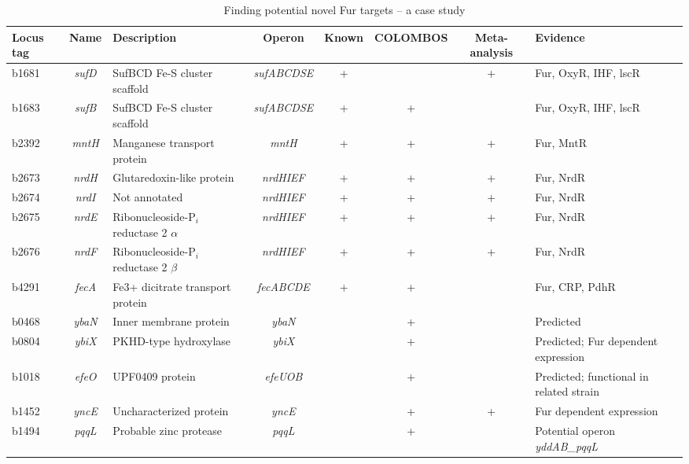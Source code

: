\begin{sidewaystable}
\centering
\caption{Finding potential novel Fur targets – a case study}
\label{tab:colTB-case}
\begin{scriptsize}
\begin{tabular}{ l c >{\raggedright}p{4cm} c c c c 
>{\raggedright\arraybackslash}p{4cm} }
	\toprule
	\textbf{{\scriptsize Locus tag}} & \textbf{{\scriptsize Name}} & \textbf{{\scriptsize Description}} & \textbf{{\scriptsize Operon}} & \textbf{{\scriptsize Known}} & \textbf{{\scriptsize COLOMBOS}} & \textbf{{\scriptsize Meta-analysis}} & \textbf{{\scriptsize Evidence}} \\
	\midrule
	b1681 & \textit{sufD} & SufBCD Fe-S cluster scaffold & \textit{sufABCDSE} & + & & + & Fur, OxyR, IHF, lscR \\[1ex]
	b1683 & \textit{sufB} & SufBCD Fe-S cluster scaffold & \textit{sufABCDSE} & + & + & & Fur, OxyR, IHF, lscR \\[1ex]
	b2392 & \textit{mntH} & Manganese transport protein & \textit{mntH} & + & + & + & Fur, MntR \\[1ex]
	b2673 & \textit{nrdH} & Glutaredoxin-like protein & \textit{nrdHIEF} & + & + & + & Fur, NrdR \\[1ex]
	b2674 & \textit{nrdI} & Not annotated & \textit{nrdHIEF} & + & + & + & Fur, NrdR \\[1ex]
	b2675 & \textit{nrdE} & Ribonucleoside-P$_i$ reductase 2 $\alpha$ & \textit{nrdHIEF} & + & + & + & Fur, NrdR \\[1ex]
	b2676 & \textit{nrdF} & Ribonucleoside-P$_i$ reductase 2 $\beta$ & \textit{nrdHIEF} & + & + & + & Fur, NrdR \\[1ex]
	b4291 & \textit{fecA} & Fe3+ dicitrate transport protein & \textit{fecABCDE} & + & + & & Fur, CRP, PdhR \\[1ex]
	b0468 & \textit{ybaN} & Inner membrane protein & \textit{ybaN} & & + & & Predicted \\[1ex]
	b0804 & \textit{ybiX} & PKHD-type hydroxylase & \textit{ybiX} & & + & & Predicted; Fur dependent expression \\[1ex]
	b1018 & \textit{efeO} & UPF0409 protein & \textit{efeUOB} & & + & & Predicted; functional in related strain \\[1ex]
	b1452 & \textit{yncE} & Uncharacterized protein & \textit{yncE} & & + & + & Fur dependent expression \\[1ex]
	b1494 & \textit{pqqL} & Probable zinc protease & \textit{pqqL} & & + & & Potential operon \textit{yddAB\_pqqL} \\[1ex]

\end{tabular}
\end{scriptsize}
\end{sidewaystable}
